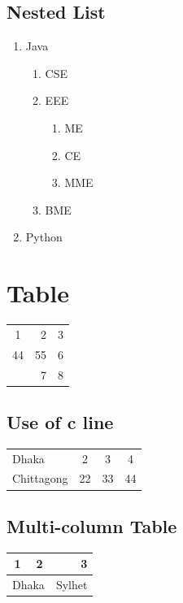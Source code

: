 \documentclass[14pt, a4paper]{article}
\begin{document}
\subsection{Nested List}
\begin{enumerate}
    \item {Java}
    \begin{enumerate}
        \item {CSE}
        \item EEE
        \begin{enumerate}
            \item {ME}
            \item CE
            \item MME
        \end{enumerate}
        \item BME
    \end{enumerate}
    \item Python
\end{enumerate}

\section{Table}
\begin{tabular}{|cr|c|}
    \hline
     1 & 2 & 3 \\
     44 & 55 & 6 \\
     \hline
     & 7 & 8 \\
     \hline
\end{tabular}

\newpage

\subsection {Use of c line}
\begin{tabular}{|l|c|c|c|}
    \cline{1-2}
    Dhaka & 2 & 3 & 4 \\
     \cline{1-1} \cline{4-4}
    Chittagong & 22 & 33 & 44 \\
     \hline
\end{tabular}

\subsection{Multi-column Table}
\begin{tabular}{|c|c|r|}
    \hline
    1 & 2 & 3 \\
    \hline
    \multicolumn{2}{c|}{Dhaka} & Sylhet\\
    \hline
\end{tabular}
\end{document}
